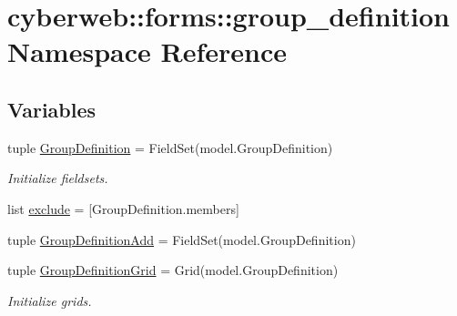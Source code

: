 \hypertarget{namespacecyberweb_1_1forms_1_1group__definition}{\section{cyberweb\-:\-:forms\-:\-:group\-\_\-definition \-Namespace \-Reference}
\label{namespacecyberweb_1_1forms_1_1group__definition}
}
\subsection*{\-Variables}
\begin{DoxyCompactItemize}
\item 
tuple \hyperlink{namespacecyberweb_1_1forms_1_1group__definition_a8e5cf35d0c0b1c18021829a3ebc8f2ce}{\-Group\-Definition} = \-Field\-Set(model.\-Group\-Definition)
\begin{DoxyCompactList}\small\item\em \-Initialize fieldsets. \end{DoxyCompactList}\item 
list \hyperlink{namespacecyberweb_1_1forms_1_1group__definition_a6c3dbe34308da70785e9b11e3ca91c00}{exclude} = \mbox{[}\-Group\-Definition.\-members\mbox{]}
\item 
tuple \hyperlink{namespacecyberweb_1_1forms_1_1group__definition_a94d308b7e2f934f20a77a3b519652455}{\-Group\-Definition\-Add} = \-Field\-Set(model.\-Group\-Definition)
\item 
tuple \hyperlink{namespacecyberweb_1_1forms_1_1group__definition_a0e5abaf35b5804df4546e5fb5bd79868}{\-Group\-Definition\-Grid} = \-Grid(model.\-Group\-Definition)
\begin{DoxyCompactList}\small\item\em \-Initialize grids. \end{DoxyCompactList}\end{DoxyCompactItemize}


